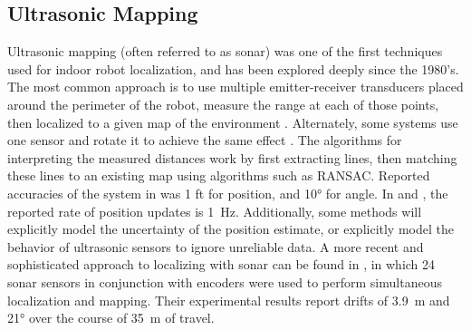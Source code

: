 \documentclass{article}
\begin{document}

  \subsection{Ultrasonic Mapping}

    Ultrasonic mapping (often referred to as sonar) was one of the first techniques used for indoor robot localization, and has been explored deeply since the 1980's. The most common approach is to use multiple emitter-receiver transducers placed around the perimeter of the robot, measure the range at each of those points, then localized to a given map of the environment \cite{drumheller_mobile_1987}. Alternately, some systems use one sensor and rotate it to achieve the same effect \cite{leonard_mobile_1991, drumheller_mobile_1987}. The algorithms for interpreting the measured distances work by first extracting lines, then matching these lines to an existing map using algorithms such as RANSAC. Reported accuracies of the system in \cite{drumheller_mobile_1987} was 1 ft for position, and \ang{10} for angle. In \cite{drumheller_mobile_1987} and \cite{leonard_mobile_1991}, the reported rate of position updates is \SI{1}{\hertz}. Additionally, some methods will explicitly model the uncertainty of the position estimate, or explicitly model the behavior of ultrasonic sensors to ignore unreliable data. A more recent and sophisticated approach to localizing with sonar can be found in \cite{tardos_robust_2002}, in which 24 sonar sensors in conjunction with encoders were used to perform simultaneous localization and mapping. Their experimental results report drifts of \SI{3.9}{\meter} and \ang{21} over the course of \SI{35}{\meter} of travel.
\end{document}
